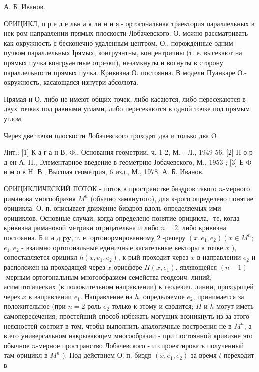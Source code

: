 \documentclass[10pt]{article}
\begin{document}
А. Б. Иванов.

ОРИЦИКЛ, п р е д е льн а я ли н и я,- ортогональная траектория параллельных в нек-ром направлении прямых плоскости Лобачевского. О. можно рассматривать как окружность с бесконечно удаленным центром. О., порожденные одним пучком параллельных Ірямых, конгруэнтны, концентричны (т. е. высекают на прямых пучка конгруәнтные отрезки), незамкнуты и вогнуты в сторону параллельности прямых пучка. Кривизна О. постоянна. В модели Пуанкаре О.- окружность, касающаяся изнутри абсолюта.

Прямая и О. либо не имеют общих точек, либо касаются, либо пересекаются в двух точках под равными углами, либо пересекаются в одной точке под прямым углом.

Через две точки плоскости Лобачевского гроходят два и только два $\mathrm{O}$

Лит.: [1] К а г а н В. Ф., Основания геометрии, ч. 1-2, М. - Л., 1949-56; [2] Н о р д ен А. П., Элементарное введение в геометрию Јобачевского, М., 1953 ; [3] Е Ф и м о в Н. В., Высшая геометрия, 6 изд., М., 1978. А. Б. Иванов.

ОРИЦИКЛИЧЕСКИЙ ПОТОК - поток в пространстве биэдров такого $n$-мерного риманова многообразия $M^{n}$ (обычно замкнутого), для к-рого определено понятие орицикла; О. п. описывает движение биэдров вдоль определяемых ими орициклов. Основные случаи, когда определено понятие орицикла,- те, когда кривизна римановой метрики отрицательна и либо $n=2$, либо кривизна постоянна. Б и ә д $\mathbf{p} \mathbf{y}$, т. е. ортонормированному 2 -реперу $\left(x, e_{1}, e_{2}\right)\left(x \in M^{n}\right.$; $e_{1}, e_{2}$ - взаимно ортогональные единичные касательные векторы в точке $x$ ), сопоставляется орицикл $h\left(x, e_{1}, e_{2}\right)$, к-рый проходит через $x$ в направлении $e_{2}$ и расположен на проходящей через $x$ орисфере $H\left(x, e_{1}\right)$, являющейся $(n-1)$-мерным ортогональным многообразием семейства геодезич. линий, асимптотических (в положительном направлении) к геодезич. линии, проходящей через $x$ в ваправлении $e_{1}$. Направление на $h$, определяемое $e_{2}$, принимается за положительное (при $n=2$ роль $e_{2}$ только к этому и сводится; $H$ и $h$ могут иметь самопересечения; простейший способ избежать могущих возникнуть из-за этого неясностей состоит в том, чтобы выполнить аналогичные построения не в $M^{n}$, а в его универсальном накрывающем многообразии - при постоянной кривизне это обычное $n$-мерное пространство Лобачевского - и спроектировать полученный там орицикл в $M^{n}$ ). Под действием О. п. биэдр $\left(x, e_{1}, e_{2}\right)$ за время $t$ переходит в
\end{document}
